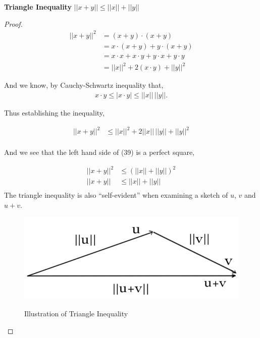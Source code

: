 \documentclass[12pt]{article}
\newenvironment{definition}[2][Definition]{\begin{trivlist}
\item[\hskip \labelsep {\bfseries #1}\hskip \labelsep {\bfseries #2}]}{\end{trivlist}}
\begin{document}
\begin{definition}{2.13} \textbf{Triangle Inequality} \(||x+y|| \leq ||x||+||y||\)
\begin{proof}
\begin{equation}
\begin{split}
    ||x+y||^2 &= (x+y)\cdot(x+y) \\
    &= x\cdot(x+y)+y\cdot(x+y) \\
    &= x \cdot x + x \cdot y + y \cdot x + y \cdot y \\ 
    &= ||x||^2+2(x\cdot y)+||y||^2
\end{split}
\end{equation}

\noindent
And we know, by Cauchy-Schwartz inequality that,
\begin{equation}
\begin{split}
    x\cdot y \leq |x\cdot y| \leq ||x|| \, ||y||.
\end{split}
\end{equation}

\noindent
Thus establishing the inequality,

\begin{equation}
\begin{split}
    ||x+y||^2 &\leq ||x||^2 + 2||x||\,||y|| + ||y||^2 \\
\end{split}
\end{equation}

\noindent
And we see that the left hand side of (39) is a perfect square,

\begin{equation}
\begin{split}
    ||x+y||^2 &\leq (||x|| + ||y||)^2 \\
    ||x+y|| &\leq ||x||+||y|| \\
\end{split}
\end{equation}
\noindent
The triangle inequality is also “self-evident” when examining a sketch of $u$, $v$ and $u+v$.

\begin{figure}[h]
\caption{Illustration of Triangle Inequality}
\centering
\includegraphics[scale=0.5]{triangle}
\label{fig:triequal}
\end{figure}

\end{proof}
\end{definition}
\end{document}

